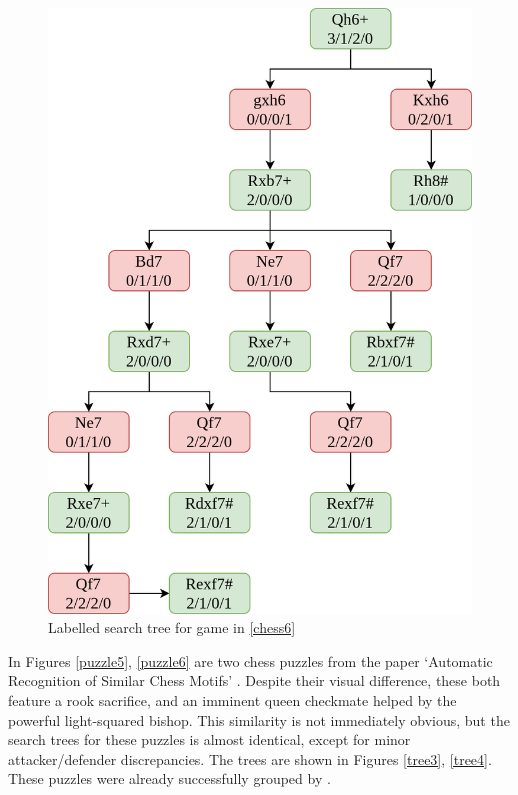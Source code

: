 \begin{figure}[H]
\begin{minipage}{0.475\textwidth}
    \includegraphics[width=\textwidth]{project/img/trees/2.drawio.png}
    \caption{Labelled search tree for game in \ref{chess6}}
    \label{tree2}
  \end{minipage}
\end{figure}

In Figures \ref{puzzle5}, \ref{puzzle6} are two chess puzzles from the paper
`Automatic Recognition of Similar Chess Motifs' \citep{chessMotifs}. Despite
their visual difference, these both feature a rook sacrifice, and an imminent
queen checkmate helped by the powerful light-squared bishop. This similarity is
not immediately obvious, but the search trees for these puzzles is almost
identical, except for minor attacker/defender discrepancies. The trees are
shown in Figures \ref{tree3}, \ref{tree4}. These puzzles were already
successfully grouped by \citet{chessMotifs}.

